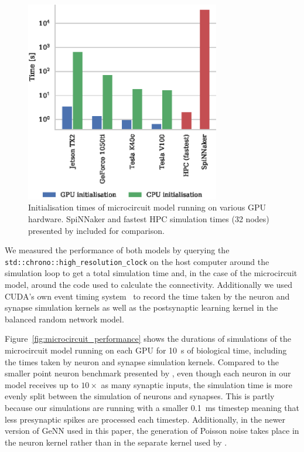 \documentclass[utf8]{frontiersSCNS} %
\begin{document}
\begin{figure}
    \begin{center}
        \includegraphics[width=85mm]{figures/microcircuit_init_performance}
    \end{center}
    \caption{Initialisation times of microcircuit model running on various GPU hardware.
    SpiNNaker and fastest HPC simulation times (32 nodes) presented by \citet{VanAlbada2018} included for comparison.}
    \label{fig:microcircuit_init_performance}
\end{figure}

We measured the performance of both models by querying the \lstinline{std::chrono::high_resolution_clock} on the host computer around the simulation loop to get a total simulation time and, in the case of the microcircuit model, around the code used to calculate the connectivity.
Additionally we used CUDA's own event timing system~\citep[Section~8.1.2]{NVIDIACorporation2018} to record the time taken by the neuron and synapse simulation kernels as well as the postsynaptic learning kernel in the balanced random network model.

Figure~\ref{fig:microcircuit_performance} shows the durations of simulations of the microcircuit model running on each GPU for \SI{10}{\second} of biological time, including the times taken by neuron and synapse simulation kernels.
Compared to the smaller point neuron benchmark presented by \citet{Yavuz2016}, even though each neuron in our model receives up to $10\times$ as many synaptic inputs, the simulation time is more evenly split between the simulation of neurons and synapses.
This is partly because our simulations are running with a smaller \SI{0.1}{\milli\second} timestep meaning that less presynaptic spikes are processed each timestep.
Additionally, in the newer version of GeNN used in this paper, the generation of Poisson noise takes place in the neuron kernel rather than in the separate kernel used by \citeauthor{Yavuz2016}.
\end{document}
